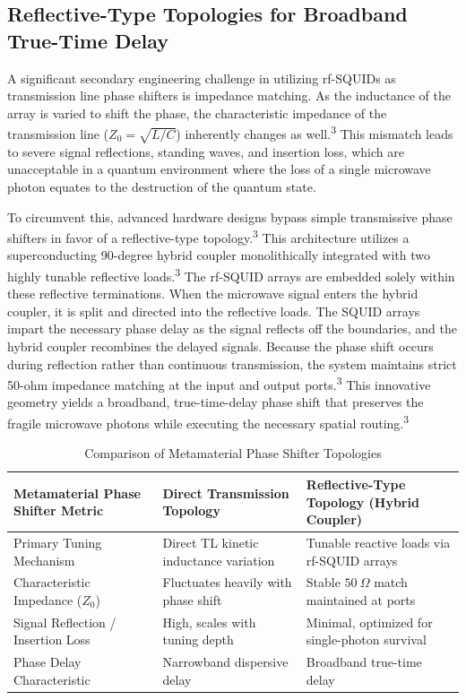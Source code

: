 \documentclass[11pt, a4paper]{article}
\begin{document}
\subsection*{Reflective-Type Topologies for Broadband True-Time Delay}

A significant secondary engineering challenge in utilizing rf-SQUIDs as transmission line phase shifters is impedance matching. As the inductance of the array is varied to shift the phase, the characteristic impedance of the transmission line ($Z_0 = \sqrt{L/C}$) inherently changes as well.\textsuperscript{3} This mismatch leads to severe signal reflections, standing waves, and insertion loss, which are unacceptable in a quantum environment where the loss of a single microwave photon equates to the destruction of the quantum state.

To circumvent this, advanced hardware designs bypass simple transmissive phase shifters in favor of a reflective-type topology.\textsuperscript{3} This architecture utilizes a superconducting 90-degree hybrid coupler monolithically integrated with two highly tunable reflective loads.\textsuperscript{3} The rf-SQUID arrays are embedded solely within these reflective terminations. When the microwave signal enters the hybrid coupler, it is split and directed into the reflective loads. The SQUID arrays impart the necessary phase delay as the signal reflects off the boundaries, and the hybrid coupler recombines the delayed signals. Because the phase shift occurs during reflection rather than continuous transmission, the system maintains strict 50-ohm impedance matching at the input and output ports.\textsuperscript{3} This innovative geometry yields a broadband, true-time-delay phase shift that preserves the fragile microwave photons while executing the necessary spatial routing.\textsuperscript{3}

\begin{table}[h]
\centering
\renewcommand{\arraystretch}{1.3}
\begin{tabular}{p{} p{} p{}}
\toprule
\textbf{Metamaterial Phase Shifter Metric} & \textbf{Direct Transmission Topology} & \textbf{Reflective-Type Topology (Hybrid Coupler)} \\
\midrule
Primary Tuning Mechanism & Direct TL kinetic inductance variation & Tunable reactive loads via rf-SQUID arrays \\
Characteristic Impedance ($Z_0$) & Fluctuates heavily with phase shift & Stable $50~\Omega$ match maintained at ports \\
Signal Reflection / Insertion Loss & High, scales with tuning depth & Minimal, optimized for single-photon survival \\
Phase Delay Characteristic & Narrowband dispersive delay & Broadband true-time delay \\
\bottomrule
\end{tabular}
\caption{Comparison of Metamaterial Phase Shifter Topologies}
\end{table}
\end{document}
